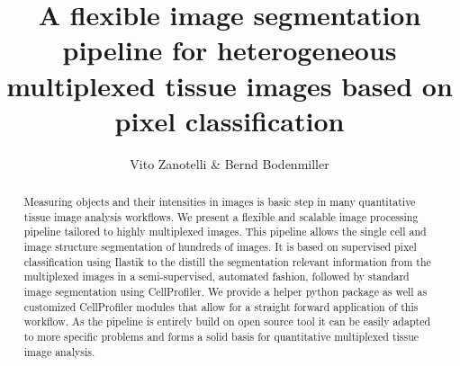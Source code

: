 \documentclass[a4paper]{article}
\title{A flexible image segmentation pipeline for heterogeneous multiplexed tissue images based on pixel classification}
\author{Vito Zanotelli \& Bernd Bodenmiller}
\begin{document}
\maketitle

\begin{abstract}
Measuring objects and their intensities in images is basic step in many quantitative tissue image
analysis workflows. We present a flexible and scalable image processing pipeline tailored to
highly multiplexed images. This pipeline allows the single cell and image structure segmentation of
hundreds of images. It is based on supervised pixel classification using Ilastik to the distill the
segmentation relevant information from the multiplexed images in a semi-supervised, automated fashion,
followed by standard image segmentation using CellProfiler. We provide a helper python package as
well as customized CellProfiler modules that allow for a straight forward application of this
workflow. As the pipeline is entirely build on open source tool it can be easily adapted to more
specific problems and forms a solid basis for quantitative multiplexed tissue image analysis.

\end{abstract}
\end{document}
